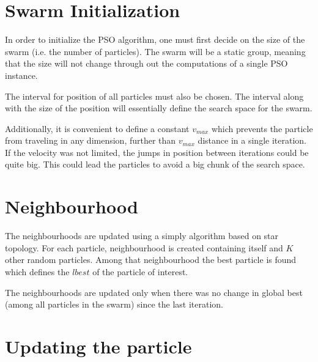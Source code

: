 \documentclass{book}
\begin{document}


\section{Swarm Initialization}
In order to initialize the PSO algorithm, one must first decide on the size of the swarm (i.e. the number of particles). The swarm will be a static group, meaning that the size will not change through out the computations of a single PSO instance.

The interval for position of all particles must also be chosen. The interval along with the size of the position will essentially define the search space for the swarm.

Additionally, it is convenient to define a constant $v_{max}$ which prevents the particle from traveling in any dimension, further than $v_{max}$ distance in a single iteration. If the velocity was not limited, the jumps in position between iterations could be quite big. This could lead the particles to avoid a big chunk of the search space.


\section{Neighbourhood}

The neighbourhoods are updated using a simply algorithm based on star topology.
For each particle, neighbourhood is created containing itself and $K$ other random particles. Among that neighbourhood the best particle is found which defines the $lbest$ of the particle of interest.

The neighbourhoods are updated only when there was no change in global best (among all particles in the swarm) since the last iteration.


\section{Updating the particle}
\end{document}
